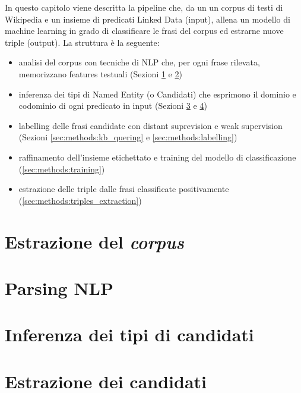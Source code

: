 In questo capitolo viene descritta la pipeline che, da un un corpus di testi di Wikipedia e un insieme di predicati Linked Data (input), allena un modello di machine learning in grado di classificare le frasi del corpus ed estrarne nuove triple (output).
La struttura è la seguente:
\begin{itemize}

\item analisi del corpus con tecniche di NLP che, per ogni frase rilevata, memorizzano features testuali (Sezioni \ref{sec:methods:text_extraction} e \ref{sec:methods:parsing_nlp})

\item inferenza dei tipi di Named Entity (o Candidati) che esprimono il dominio e codominio di ogni predicato in input (Sezioni \ref{sec:methods:candidate_inference} e \ref{sec:methods:candidate_extraction})

\item labelling delle frasi candidate con distant suprevision e weak supervision  (Sezioni \ref{sec:methods:kb_quering} e \ref{sec:methods:labelling})

\item raffinamento dell'insieme etichettato e training del modello di classificazione (\ref{sec:methods:training})

\item estrazione delle triple dalle frasi classificate positivamente (\ref{sec:methods:triples_extraction})
\end{itemize} 

 

\section{Estrazione del \textit{corpus}}
\label{sec:methods:text_extraction}

\section{Parsing NLP}
\label{sec:methods:parsing_nlp}

\section{Inferenza dei tipi di candidati}
\label{sec:methods:candidate_inference}

\section{Estrazione dei candidati}
\label{sec:methods:candidate_extraction}

